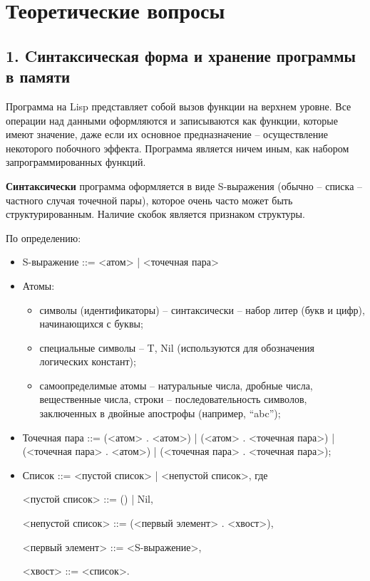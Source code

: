 \section*{Теоретические вопросы}
\subsection*{1. Cинтаксическая форма и хранение программы в памяти}

Программа на Lisp представляет собой вызов функции на верхнем уровне. Все операции над данными оформляются и  записываются как функции, которые имеют значение, даже если их основное предназначение – осуществление некоторого побочного эффекта. Программа является ничем иным, как набором запрограммированных функций.

\textbf{Синтаксически} программа оформляется в виде S-выражения (обычно -- списка -- частного случая точечной пары), которое очень часто может быть структурированным. Наличие скобок является признаком структуры. 

По определению:
\begin{itemize}
	\item S-выражение ::= <атом> | <точечная пара>

	\item Атомы:
\begin{itemize} 
	\item символы (идентификаторы) – синтаксически – набор литер (букв и цифр), начинающихся с буквы;
	\item специальные символы – {T, Nil} (используются для обозначения логических констант);
	\item самоопределимые атомы – натуральные числа, дробные числа, вещественные числа, строки – последовательность символов, заключенных в двойные апострофы (например, “abc”);
\end{itemize} 


\item Точечная пара ::= (<атом> . <атом>) | (<атом> . <точечная пара>) | (<точечная пара> . <атом>) | (<точечная пара> . <точечная пара>);

\item Список ::= <пустой список> | <непустой список>, где 

<пустой список> ::= () | Nil,

<непустой список> ::= (<первый элемент> . <хвост>),

<первый элемент> ::= <S-выражение>,

<хвост> ::= <список>.

\end{itemize}

